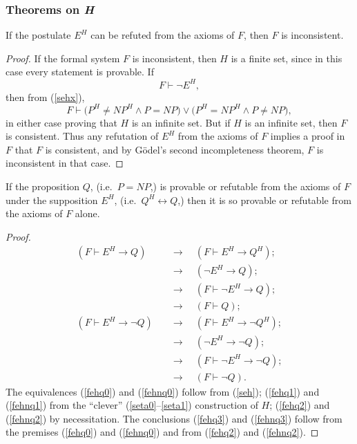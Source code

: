 \documentclass[letterpaper]{article}
\begin{document}
\subsubsection{Theorems on \textit{H}}
\begin{theorem}
	If the postulate $E^H$ can be refuted from the axioms of $F$, then $F$ is inconsistent.
\end{theorem}
\begin{proof}
If the formal system $F$ is inconsistent, then $H$ is a finite set, since in this case every statement is provable.  If
\begin{equation}
F\vdash \lnot E^H,
\end{equation}
then from (\ref{sehx}),
\begin{equation}
F\vdash \big(P^H\ne NP^H\land P=NP\big)\lor\big(P^H=NP^H\land P\ne NP\big),
\end{equation}
in either case proving that $H$ is an infinite set.  But if $H$ is an infinite set, then $F$ is consistent.  Thus any refutation of $E^H$ from the axioms of $F$  implies a proof in $F$ that $F$ is consistent, and by G\"odel's second incompleteness theorem, $F$ is inconsistent in that case.
\end{proof}
\begin{theorem}\label{ehcnsv}
If the proposition $Q$, (i.e.~$P=NP$,) is provable or refutable from the axioms of $F$ under the supposition $E^H$, (i.e.~$Q^H\longleftrightarrow Q$,) then it is so provable or refutable from the axioms of $F$ alone.
\end{theorem}
\begin{proof}
\begin{align}
(F\vdash E^H\longrightarrow Q)\quad
&\longrightarrow\quad(F\vdash E^H\longrightarrow Q^H);\label{fehq0}\\
&\longrightarrow\quad(\lnot E^H\longrightarrow Q);\label{fehq1}\\
&\longrightarrow\quad(F\vdash\lnot E^H\longrightarrow Q);\label{fehq2}\\
&\longrightarrow\quad(F\vdash Q);\label{fehq3}\\
(F\vdash E^H\rightarrow\lnot Q)\quad
&\longrightarrow\quad(F\vdash E^H\longrightarrow\lnot Q^H);\label{fehnq0}\\
&\longrightarrow\quad(\lnot E^H\longrightarrow\lnot Q);\label{fehnq1}\\
&\longrightarrow\quad(F\vdash\lnot E^H\longrightarrow\lnot Q);\label{fehnq2}\\
&\longrightarrow\quad(F\vdash\lnot Q).\label{fehnq3}
\end{align}
The equivalences (\ref{fehq0}) and (\ref{fehnq0}) follow from (\ref{seh}); (\ref{fehq1}) and (\ref{fehnq1}) from the ``clever'' (\ref{seta0}--\ref{seta1}) construction of $H$; (\ref{fehq2}) and (\ref{fehnq2}) by necessitation.  The conclusions (\ref{fehq3}) and (\ref{fehnq3}) follow from the premises (\ref{fehq0}) and (\ref{fehnq0}) and from (\ref{fehq2}) and (\ref{fehnq2}).
\end{proof}
\end{document}
